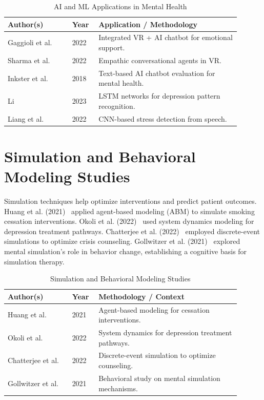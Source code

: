 \begin{table}[H]
\centering
\small
\renewcommand{\arraystretch}{1.3}
\caption{AI and ML Applications in Mental Health}
\label{tab:ai_ml}
\begin{tabular}{|p{0.25\linewidth}|p{0.1\linewidth}|p{0.55\linewidth}|}
\hline
\rowcolor{gray!15} \textbf{Author(s)} & \textbf{Year} & \textbf{Application / Methodology} \\ \hline
Gaggioli et al. & 2022 & Integrated VR + AI chatbot for emotional support. \\ \hline
Sharma et al. & 2022 & Empathic conversational agents in VR. \\ \hline
Inkster et al. & 2018 & Text-based AI chatbot evaluation for mental health. \\ \hline
Li & 2023 & LSTM networks for depression pattern recognition. \\ \hline
Liang et al. & 2022 & CNN-based stress detection from speech. \\ \hline
\end{tabular}
\end{table}
\newpage
\section{Simulation and Behavioral Modeling Studies}
Simulation techniques help optimize interventions and predict patient outcomes. Huang et al. (2021)~\cite{huang2021abm} applied agent-based modeling (ABM) to simulate smoking cessation interventions. Okoli et al. (2022)~\cite{okoli2022sdm} used system dynamics modeling for depression treatment pathways. Chatterjee et al. (2022)~\cite{chatterjee2022des} employed discrete-event simulations to optimize crisis counseling. Gollwitzer et al. (2021)~\cite{gollwitzer2021behavior} explored mental simulation's role in behavior change, establishing a cognitive basis for simulation therapy.

\begin{table}[H]
\centering
\small
\renewcommand{\arraystretch}{1.3}
\caption{Simulation and Behavioral Modeling Studies}
\label{tab:sim}
\begin{tabular}{|p{0.25\linewidth}|p{0.1\linewidth}|p{0.55\linewidth}|}
\hline
\rowcolor{gray!15} \textbf{Author(s)} & \textbf{Year} & \textbf{Methodology / Context} \\ \hline
Huang et al. & 2021 & Agent-based modeling for cessation interventions. \\ \hline
Okoli et al. & 2022 & System dynamics for depression treatment pathways. \\ \hline
Chatterjee et al. & 2022 & Discrete-event simulation to optimize counseling. \\ \hline
Gollwitzer et al. & 2021 & Behavioral study on mental simulation mechanisms. \\ \hline
\end{tabular}
\end{table}


